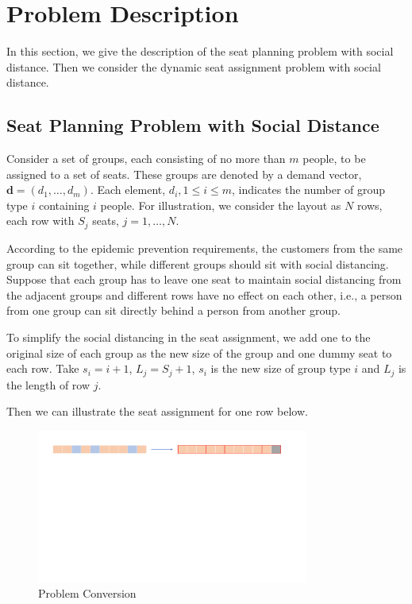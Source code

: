 \section{Problem Description}
In this section, we give the description of the seat planning problem with social distance. Then we consider the dynamic seat assignment problem with social distance.


\subsection{Seat Planning Problem with Social Distance}

Consider a set of groups, each consisting of no more than $m$ people, to be assigned to a set of seats. These groups are denoted by a demand vector, $\mathbf{d} = (d_1, \ldots, d_m)$. Each element, $d_i, 1 \leq i \leq m$, indicates the number of group type $i$ containing $i$ people. For illustration, we consider the layout as $N$ rows, each row with $S_{j}$ seats, $j = 1, \ldots, N$. 


According to the epidemic prevention requirements, the customers from the same group can sit together, while different groups should sit with social distancing. 
Suppose that each group has to leave one seat to maintain social distancing from the adjacent groups and different rows have no effect on each other, i.e., a person from one group can sit directly behind a person from another group.

To simplify the social distancing in the seat assignment, we add one to the original size of each group as the new size of the group and one dummy seat to each row. Take $s_{i} = i + 1$, $L_{j} = S_{j} +1$, $s_{i}$ is the new size of group type $i$ and $L_{j}$ is the length of row $j$.

Then we can illustrate the seat assignment for one row below. 

\begin{figure}[ht]
    \centering
    \includegraphics[width = 0.8\textwidth]{./Figures/dummy_seat.pdf}
    \caption{Problem Conversion}
\end{figure}

